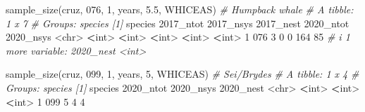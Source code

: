 \documentclass[
]{book}
\newenvironment{Shaded}{\begin{snugshade}}{\end{snugshade}}
\newcommand{\AttributeTok}[1]{\textcolor[rgb]{0.77,0.63,0.00}{#1}}
\newcommand{\CommentTok}[1]{\textcolor[rgb]{0.56,0.35,0.01}{\textit{#1}}}
\newcommand{\DecValTok}[1]{\textcolor[rgb]{0.00,0.00,0.81}{#1}}
\newcommand{\ErrorTok}[1]{\textcolor[rgb]{0.64,0.00,0.00}{\textbf{#1}}}
\newcommand{\FloatTok}[1]{\textcolor[rgb]{0.00,0.00,0.81}{#1}}
\newcommand{\FunctionTok}[1]{\textcolor[rgb]{0.00,0.00,0.00}{#1}}
\newcommand{\NormalTok}[1]{#1}
\newcommand{\SpecialCharTok}[1]{\textcolor[rgb]{0.00,0.00,0.00}{#1}}
\newcommand{\StringTok}[1]{\textcolor[rgb]{0.31,0.60,0.02}{#1}}
\begin{document}
\begin{Shaded}
\begin{Highlighting}[]
\FunctionTok{sample\_size}\NormalTok{(cruz, }\StringTok{\textquotesingle{}076\textquotesingle{}}\NormalTok{, }\DecValTok{1}\NormalTok{, years, }\FloatTok{5.5}\NormalTok{, }\StringTok{\textquotesingle{}WHICEAS\textquotesingle{}}\NormalTok{) }\CommentTok{\# Humpback whale}
\CommentTok{\# A tibble: 1 x 7}
\CommentTok{\# Groups:   species [1]}
\NormalTok{  species }\StringTok{\textasciigrave{}}\AttributeTok{2017\_ntot}\StringTok{\textasciigrave{}} \StringTok{\textasciigrave{}}\AttributeTok{2017\_nsys}\StringTok{\textasciigrave{}} \StringTok{\textasciigrave{}}\AttributeTok{2017\_nest}\StringTok{\textasciigrave{}} \StringTok{\textasciigrave{}}\AttributeTok{2020\_ntot}\StringTok{\textasciigrave{}} \StringTok{\textasciigrave{}}\AttributeTok{2020\_nsys}\StringTok{\textasciigrave{}}
  \SpecialCharTok{\textless{}}\NormalTok{chr}\SpecialCharTok{\textgreater{}}         \ErrorTok{\textless{}}\NormalTok{int}\SpecialCharTok{\textgreater{}}       \ErrorTok{\textless{}}\NormalTok{int}\SpecialCharTok{\textgreater{}}       \ErrorTok{\textless{}}\NormalTok{int}\SpecialCharTok{\textgreater{}}       \ErrorTok{\textless{}}\NormalTok{int}\SpecialCharTok{\textgreater{}}       \ErrorTok{\textless{}}\NormalTok{int}\SpecialCharTok{\textgreater{}}
\DecValTok{1} \DecValTok{076}               \DecValTok{3}           \DecValTok{0}           \DecValTok{0}         \DecValTok{164}          \DecValTok{85}
\CommentTok{\# i 1 more variable: \textasciigrave{}2020\_nest\textasciigrave{} \textless{}int\textgreater{}}

\FunctionTok{sample\_size}\NormalTok{(cruz, }\StringTok{\textquotesingle{}099\textquotesingle{}}\NormalTok{, }\DecValTok{1}\NormalTok{, years, }\DecValTok{5}\NormalTok{, }\StringTok{\textquotesingle{}WHICEAS\textquotesingle{}}\NormalTok{) }\CommentTok{\# Sei/Brydes}
\CommentTok{\# A tibble: 1 x 4}
\CommentTok{\# Groups:   species [1]}
\NormalTok{  species }\StringTok{\textasciigrave{}}\AttributeTok{2020\_ntot}\StringTok{\textasciigrave{}} \StringTok{\textasciigrave{}}\AttributeTok{2020\_nsys}\StringTok{\textasciigrave{}} \StringTok{\textasciigrave{}}\AttributeTok{2020\_nest}\StringTok{\textasciigrave{}}
  \SpecialCharTok{\textless{}}\NormalTok{chr}\SpecialCharTok{\textgreater{}}         \ErrorTok{\textless{}}\NormalTok{int}\SpecialCharTok{\textgreater{}}       \ErrorTok{\textless{}}\NormalTok{int}\SpecialCharTok{\textgreater{}}       \ErrorTok{\textless{}}\NormalTok{int}\SpecialCharTok{\textgreater{}}
\DecValTok{1} \DecValTok{099}               \DecValTok{5}           \DecValTok{4}           \DecValTok{4}


\end{Highlighting}
\end{Shaded}
\end{document}
